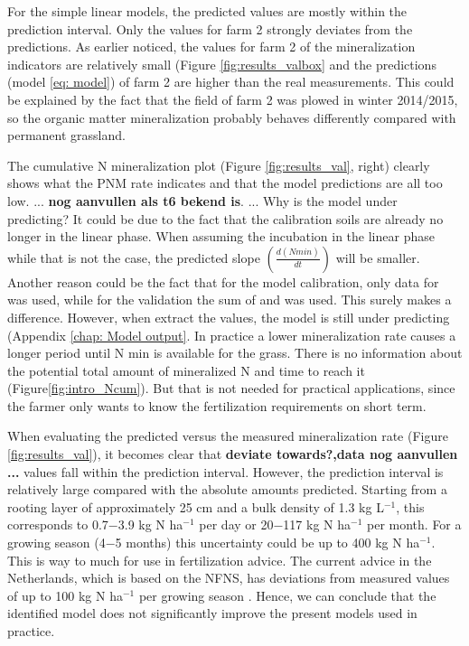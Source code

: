 \documentclass[10pt,twoside,dutch,english]{report}
\begin{document}
For the simple linear models, the predicted values are mostly within the prediction interval. Only the values for farm 2 strongly deviates from the predictions. As earlier noticed, the values for farm 2 of the mineralization indicators are relatively small (Figure \ref{fig:results_valbox} and the predictions (model \ref{eq: model}) of farm 2 are higher than the real measurements. This could be explained by the fact that the field of farm 2 was plowed in winter 2014/2015, so the organic matter mineralization probably behaves differently compared with permanent grassland. 

The cumulative N mineralization plot (Figure \ref{fig:results_val}, right) clearly shows what the PNM rate indicates and that the model predictions are all too low. ... \textbf{nog aanvullen als t6 bekend is}. ... Why is the model under predicting? It could be due to the fact that the calibration soils are already no longer in the linear phase. When assuming the incubation in the linear phase while that is not the case, the predicted slope $(\frac{d(Nmin)}{dt})$ will be smaller. Another reason could be the fact that for the model calibration, only data for  was used, while for the validation the sum of  and  was used. This surely makes a difference. However, when extract the  values, the model is still under predicting (Appendix \ref{chap: Model output}. In practice a lower mineralization rate causes a longer period until N min is available for the grass.  There is no information about the potential total amount of mineralized N and time to reach it (Figure\ref{fig:intro_Ncum}). But that is not needed for practical applications, since the farmer only wants to know the fertilization requirements on short term. 

When evaluating the predicted versus the measured mineralization rate (Figure \ref{fig:results_val}), it becomes clear that \textbf{deviate towards?,data nog aanvullen ...} values fall within the prediction interval. However, the prediction interval is relatively large compared with the absolute amounts predicted. Starting from a rooting layer of approximately 25 cm and a bulk density of 1.3 kg L$^{-1}$, this corresponds to 0.7$-$3.9 kg N ha$^{-1}$ per day or 20$-$117 kg N ha$^{-1}$ per month. For a growing season (4$-$5 months) this uncertainty could be up to 400 kg N ha$^{-1}$.   This is way to much for use in fertilization advice. The current advice in the Netherlands, which is based on the NFNS, has deviations from measured values of up to 100 kg N ha$^{-1}$ per growing season \citep{Ros2015}. Hence, we can conclude that the identified model does not significantly improve the present models used in practice. 
\end{document}
